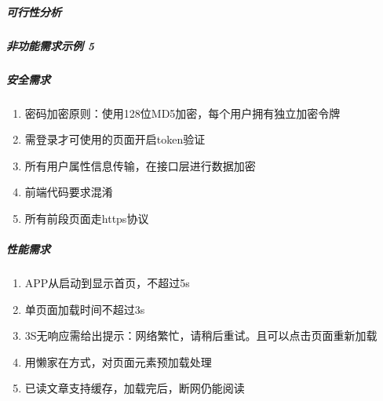 \documentclass[letterpaper,10pt,english]{sphinxmanual}
\begin{document}
\subparagraph{可行性分析}
\label{\detokenize{chapter_knowledge/MRD:id5}}


\subparagraph{非功能需求示例 5\sphinxfootnotemark[561]}
\label{\detokenize{chapter_knowledge/MRD:id6}}%
\begin{footnotetext}[561]\sphinxAtStartFootnote
{}
%
\end{footnotetext}\ignorespaces 

\subparagraph{安全需求}
\label{\detokenize{chapter_knowledge/MRD:id7}}\begin{enumerate}
%
\item {} 
密码加密原则：使用128位MD5加密，每个用户拥有独立加密令牌

\item {} 
需登录才可使用的页面开启token验证

\item {} 
所有用户属性信息传输，在接口层进行数据加密

\item {} 
前端代码要求混淆

\item {} 
所有前段页面走https协议

\end{enumerate}


\subparagraph{性能需求}
\label{\detokenize{chapter_knowledge/MRD:id8}}\begin{enumerate}
%
\item {} 
APP从启动到显示首页，不超过5s

\item {} 
单页面加载时间不超过3s

\item {} 
3S无响应需给出提示：网络繁忙，请稍后重试。且可以点击页面重新加载

\item {} 
用懒家在方式，对页面元素预加载处理

\item {} 
已读文章支持缓存，加载完后，断网仍能阅读

\end{enumerate}
\end{document}
